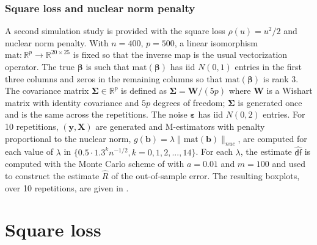 \documentclass[11pt]{amsart}
\numberwithin{equation}{section}
\numberwithin{equation}{section}
\def\real{{\mathbb{R}}}
\def\R{{\real}}
\def\mathbold{\boldsymbol} %
\def\bb{\mathbold{b}}\def\bhat{\widehat{b}}\def\btil{\widetilde{b}}
\def\bW{{\mathbold{W}}}\def\hbW{{\widehat{\bW}}}\def\tbW{{\widetilde{\bW}}}
\def\bX{\mathbold{X}}\def\hbX{{\widehat{\bX}}}\def\tbX{{\widetilde{\bX}}}\def\bXbar{{\overline \bX}}
\def\by{\mathbold{y}}\def\yhat{\widehat{y}}\def\ytil{\widetilde{y}}\def\ybar{{\overline y}}\def\vby{{\bf y}}
\def\bbeta{\mathbold{\beta}}\def\betahat{\widehat{\beta}}\def\hbeta{\widehat{\beta}}
\def\ep{\varepsilon}\def\eps{\epsilon}\def\veps{\varepsilon}
\def\bep{ {\mathbold{\ep} }}
\def\bSigma{\mathbold{\Sigma}}\def\hbSigma{{\widehat{\bSigma}}}
\def\df{{\hat{\mathsf{df}}}{}}
\begin{document}
\subsubsection{Square loss and nuclear norm penalty}
\label{sec:trace-norm-simu}

A second simulation study is provided with the square loss $\rho(u)=u^2/2$
and nuclear norm penalty.
With $n=400$, $p=500$,
a linear isomorphism $\text{mat}:\R^p\to\R^{20\times 25}$ is fixed
so that the inverse map is the usual vectorization operator.
The true $\bbeta$ is such that $\text{mat}(\bbeta)$ has iid $N(0,1)$
entries in the first three columns and zeros in the remaining columns
so that $\text{mat}(\bbeta)$ is rank 3.
The covariance matrix $\bSigma\in\R^p$ is defined as
$\bSigma = \bW/(5p)$ where $\bW$ is a Wishart matrix with identity covariance
and $5p$ degrees of freedom; $\bSigma$ is generated once and is the same
across the repetitions.
The noise $\bep$ has iid $N(0,2)$ entries.
For 10 repetitions, $(\by,\bX)$ are generated and M-estimators with
penalty proportional to the nuclear norm,
$g(\bb) = \lambda \|\text{mat}(\bb)\|_{nuc}$, are computed
for each value of $\lambda$
in $\{0.5 \cdot 1.3^k n^{-1/2}, k=0,1,2,...,14\}$.
For each $\lambda$, the estimate $\df$
is computed with the Monte Carlo scheme of 
with $a=0.01$ and $m=100$ and used to construct the estimate $\hat R$
of the out-of-sample error.
The resulting boxplots, over 10 repetitions, are given in .


\section{Square loss}
\label{sec:square_loss}
\end{document}
